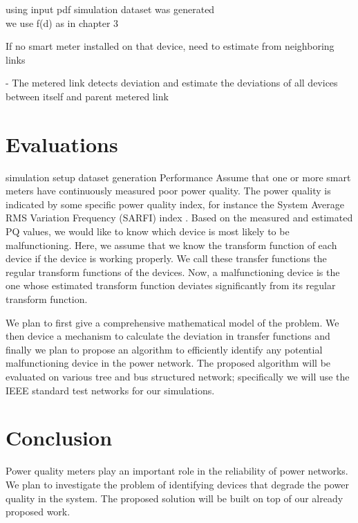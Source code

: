 \documentclass[12pt,oneside]{book}
\begin{document}
using input pdf simulation dataset was generated\\
we use f(d) as in chapter 3

If no smart meter installed on that device, need to estimate from neighboring links

- The metered link detects deviation and estimate the deviations of all devices between itself and parent metered link

\section{Evaluations}
simulation setup
dataset generation
Performance
Assume that one or more smart meters have continuously measured poor power quality. The power quality is indicated by some specific power quality index, for instance the System Average RMS Variation Frequency (SARFI) index . Based on the measured and estimated PQ values, we would like to know which device is most likely to be malfunctioning. Here, we assume that we know the transform function of each device if the device is working properly. We call these transfer functions the regular transform functions of the devices. Now, a malfunctioning device is the one whose estimated transform function deviates significantly from its regular transform function.

We plan to first give a comprehensive mathematical model of the problem. We then device a mechanism to calculate the deviation in transfer functions and finally we plan to propose an algorithm to efficiently identify any potential malfunctioning device in the power network. The proposed algorithm will be evaluated on various tree and bus structured network; specifically we will use the IEEE standard test networks for our simulations.

\section{Conclusion}
Power quality meters play an important role in the reliability of power networks. We plan to investigate the problem of identifying devices that degrade the power quality in the system. The proposed solution will be built on top of our already proposed work.


\end{document}
